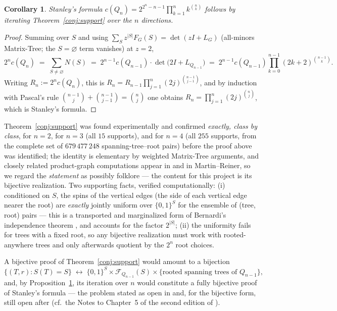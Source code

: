 \documentclass[11pt]{amsart}
\newtheorem{corollary}[theorem]{Corollary}
\theoremstyle{definition}
\begin{document}
\begin{corollary}\label{prop:telescope}
Stanley's formula
$c(Q_n) = 2^{2^n-n-1}\prod_{k=1}^n k^{\binom nk}$ follows by iterating
Theorem~\ref{conj:support} over the $n$ directions.
\end{corollary}

\begin{proof}
Summing over $S$ and using
$\sum_{S} z^{|S|} F_G(S) = \det(zI + L_G)$ (all-minors Matrix-Tree; the
$S=\varnothing$ term vanishes) at $z=2$,
\[
  2^n c(Q_n) \;=\; \sum_{S\neq\varnothing} N(S)
  \;=\; 2^{n-1}c(Q_{n-1}) \cdot \det\bigl(2I + L_{Q_{n-1}}\bigr)
  \;=\; 2^{n-1}c(Q_{n-1}) \prod_{k=0}^{n-1} (2k+2)^{\binom{n-1}{k}} .
\]
Writing $R_n := 2^n c(Q_n)$, this is
$R_n = R_{n-1} \prod_{j=1}^{n} (2j)^{\binom{n-1}{j-1}}$, and by induction
with Pascal's rule $\binom{n-1}{j}+\binom{n-1}{j-1}=\binom nj$ one obtains
$R_n = \prod_{j=1}^n (2j)^{\binom nj}$, which is Stanley's formula.
\end{proof}

Theorem~\ref{conj:support} was found experimentally and confirmed
\emph{exactly, class by class}, for $n=2$, for $n=3$ (all $15$ supports),
and for $n=4$ (all $255$ supports, from the complete set of
$679\,477\,248$ spanning-tree--root pairs) before the proof above was
identified; the identity is elementary by weighted Matrix-Tree arguments,
and closely related product-graph computations appear in
\cite{bernardi} and in Martin--Reiner, so we regard the \emph{statement} as
possibly folklore --- the content for this project is its bijective
realization. Two supporting facts, verified
computationally: (i) conditioned on $S$, the spins of the vertical edges
(the side of each vertical edge nearer the root) are \emph{exactly} jointly
uniform over $\{0,1\}^S$ for the ensemble of (tree, root) pairs --- this is
a transported and marginalized form of Bernardi's independence theorem
\cite[Thm.~1]{bernardi}, and accounts for the factor $2^{|S|}$; (ii) the
uniformity fails for trees with a fixed root, so any bijective realization
must work with rooted-anywhere trees and only afterwards quotient by the
$2^n$ root choices.

A bijective proof of Theorem~\ref{conj:support} would amount to a
bijection
\[
  \{(T,r) : S(T)=S\} \;\longleftrightarrow\;
  \{0,1\}^S \times \mathcal F_{Q_{n-1}}(S) \times
  \{\text{rooted spanning trees of } Q_{n-1}\},
\]
and, by Proposition~\ref{prop:telescope}, its iteration over $n$ would
constitute a fully bijective proof of Stanley's formula --- the problem
stated as open in \cite[Example 5.6.10]{ec2} and, for the bijective form,
still open after \cite{bernardi} (cf.\ the Notes to Chapter~5 of the second
edition of \cite{ec2}).
\end{document}
